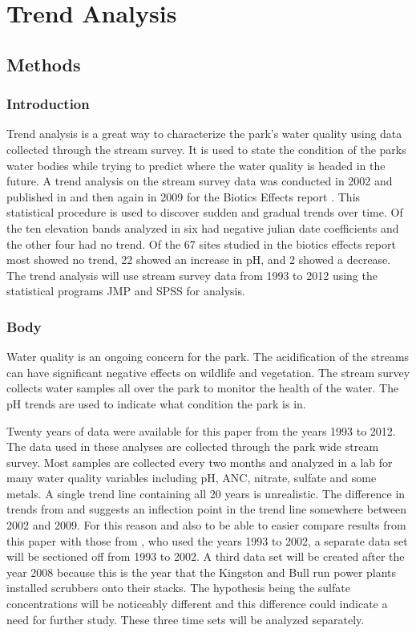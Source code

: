 \chapter{Trend Analysis}\label{ch:TA}
\section{Methods}
\subsection{Introduction}

Trend analysis is a great way to characterize the park's water quality using data collected through the stream survey.  It is used to state the condition of the parks water bodies while trying to predict where the water quality is headed in the future.  A trend analysis on the stream survey data was conducted in 2002 and published in \citep{robinson2008ph} and then again in 2009 for the Biotics Effects report \citep{cai2012}.  This statistical procedure is used to discover sudden and gradual trends over time.  Of the ten elevation bands analyzed in \citep{robinson2008ph} six had negative julian date coefficients and the other four had no trend.  Of the 67 sites studied in the biotics effects report most showed no trend, 22 showed an increase in pH, and 2 showed a decrease\citep{cai2012}.  The trend analysis will use stream survey data from 1993 to 2012 using the statistical programs JMP and SPSS for analysis.

\subsection{Body}

Water quality is an ongoing concern for the park.  The acidification of the streams can have significant negative effects on wildlife and vegetation.   The stream survey collects water samples all over the park to monitor the health of the water.  The pH trends are used to indicate what condition the park is in.
	
Twenty years of data were available for this paper from the years 1993 to 2012.  The data used in these analyses are collected through the park wide stream survey.  Most samples are collected every two months and analyzed in a lab for many water quality variables including pH, ANC, nitrate, sulfate and some metals.  %
A single trend line containing all 20 years is unrealistic.  The difference in trends from \citet{robinson2008ph} and \citet{cai2012} suggests an inflection point in the trend line somewhere between 2002 and 2009.  For this reason and also to be able to easier compare results from this paper with those from \citet{robinson2008ph}, who used the years 1993 to 2002, a separate data set will be sectioned off from 1993 to 2002.  A third data set will be created after the year 2008 because this is the year that the Kingston and Bull run power plants installed scrubbers onto their stacks.  The hypothesis being the sulfate concentrations will be noticeably different and this difference could indicate a need for further study.  These three time sets will be analyzed separately. 

